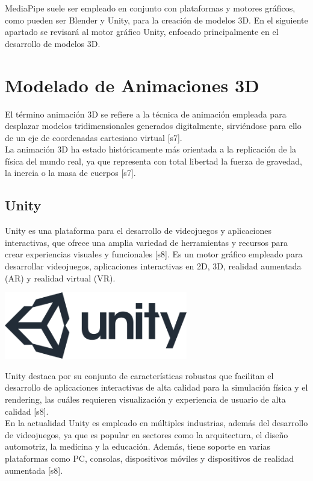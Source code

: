 MediaPipe suele ser empleado en conjunto con plataformas y motores gráficos, como pueden ser Blender y Unity, para la creación de modelos 3D. En el siguiente apartado se revisará al motor gráfico Unity, enfocado principalmente en el desarrollo de modelos 3D.

\section{Modelado de Animaciones 3D}
El término animación 3D se refiere a la técnica de animación empleada para desplazar modelos tridimensionales generados digitalmente, sirviéndose para ello de un eje de coordenadas cartesiano virtual [s7].\\

La animación 3D ha estado históricamente más orientada a la replicación de la física del mundo real, ya que representa con total libertad la fuerza de gravedad, la inercia o la masa de cuerpos [s7].

\subsection{Unity}
Unity es una plataforma para el desarrollo de videojuegos y aplicaciones interactivas, que ofrece una amplia variedad de herramientas y recursos para crear experiencias visuales y funcionales [s8]. Es un motor gráfico empleado para desarrollar videojuegos, aplicaciones interactivas en 2D, 3D, realidad aumentada (AR) y realidad virtual (VR).\\

\begin{center}
    \includegraphics[width=0.6\textwidth]{Images/Cap 2/Unity_Logo.png}
\end{center}

Unity destaca por su conjunto de características robustas que facilitan el desarrollo de aplicaciones interactivas de alta calidad para la simulación física y el rendering, las cuáles requieren visualización y experiencia de usuario de alta calidad [s8].\\

En la actualidad Unity es empleado en múltiples industrias, además del desarrollo de videojuegos, ya que es popular en sectores como la arquitectura, el diseño automotriz, la medicina y la educación. Además, tiene soporte en varias plataformas como PC, consolas, dispositivos móviles y dispositivos de realidad aumentada [s8].\\

